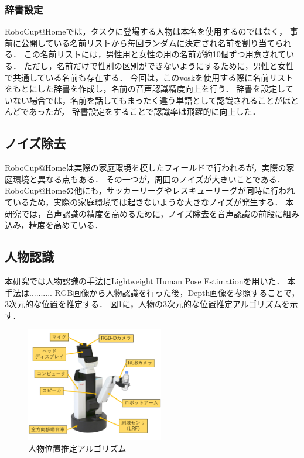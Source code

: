\documentclass[a4j]{jarticle}
\begin{document}
\subsubsection{辞書設定}
RoboCup@Homeでは，タスクに登場する人物は本名を使用するのではなく，
事前に公開している名前リストから毎回ランダムに決定され名前を割り当てられる．
この名前リストには，男性用と女性の用の名前が約10個ずつ用意されている．
ただし，名前だけで性別の区別ができないようにするために，男性と女性で共通している名前も存在する．
今回は，このvoskを使用する際に名前リストをもとにした辞書を作成し，名前の音声認識精度向上を行う．
辞書を設定していない場合では，名前を話してもまったく違う単語として認識されることがほとんどであったが，
辞書設定をすることで認識率は飛躍的に向上した．

\subsection{ノイズ除去}
RoboCup@Homeは実際の家庭環境を模したフィールドで行われるが，実際の家庭環境と異なる点もある．
その一つが，周囲のノイズが大きいことである．
RoboCup@Homeの他にも，サッカーリーグやレスキューリーグが同時に行われているため，実際の家庭環境では起きないような大きなノイズが発生する．
本研究では，音声認識の精度を高めるために，ノイズ除去\cite{sainburg2020finding}を音声認識の前段に組み込み，精度を高めている．

\subsection{人物認識}
本研究では人物認識の手法にLightweight Human Pose Estimation\cite{light-openpose}を用いた．
本手法は..........
RGB画像から人物認識を行った後，Depth画像を参照することで，3次元的な位置を推定する．
図\ref{human_estimation_explain}に，人物の3次元的な位置推定アルゴリズムを示す．
\begin{figure}[ht]
  \centering
  \includegraphics[width=6cm]{images/hsr/hsr_explain_ja.png}
  \caption{人物位置推定アルゴリズム}
  \label{human_estimation_explain}
\end{figure}
\end{document}
